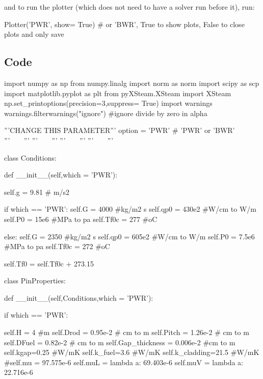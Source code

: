 \documentclass{article}
\begin{document}
and to run the plotter (which does not need to have a solver run before it), run:

\begin{python}
    Plotter('PWR', show= True) # or 'BWR', True to show plots, False to close plots and only save
\end{python}

\clearpage
\subsection{Code}
\begin{python}
import numpy as np
from numpy.linalg import norm as norm
import scipy as scp
import matplotlib.pyplot as plt
from pyXSteam.XSteam import XSteam
np.set_printoptions(precision=3,suppress= True)
import warnings
warnings.filterwarnings("ignore") #ignore divide by zero in alpha

'''CHANGE THIS PARAMETER'''
option = 'PWR' # 'PWR' or 'BWR'
'''^^^^^^^^^^^^^^^^^^^^^'''
'''^^^^^^^^^^^^^^^^^^^^^'''
'''^^^^^^^^^^^^^^^^^^^^^'''
'''^^^^^^^^^^^^^^^^^^^^^'''

class Conditions:
    
    def __init__(self,which = 'PWR'):
        
        self.g = 9.81 # m/s2
        
        if which == 'PWR':
            self.G = 4000 #kg/m2 s
            self.qp0 = 430e2 #W/cm to W/m
            self.P0 = 15e6 #MPa to pa
            self.Tf0c = 277 #oC
        
        else:
            self.G = 2350 #kg/m2 s
            self.qp0 = 605e2 #W/cm to W/m
            self.P0 = 7.5e6 #MPa to pa
            self.Tf0c = 272 #oC
            
        self.Tf0 = self.Tf0c + 273.15

class PinProperties:
    
    def __init__(self,Conditions,which = 'PWR'):
    
        if which == 'PWR':
            
            self.H = 4 #m
            self.Drod = 0.95e-2 # cm to m 
            self.Pitch = 1.26e-2 # cm to m
            self.DFuel = 0.82e-2 # cm to m
            self.Gap_thickness = 0.006e-2 #cm to m
            self.kgap=0.25 #W/mK
            self.k_fuel=3.6 #W/mK
            self.k_cladding=21.5 #W/mK
            #self.mu = 97.575e-6
            self.muL = lambda a: 69.403e-6
            self.muV = lambda a: 22.716e-6
        

\end{python}
\end{document}
